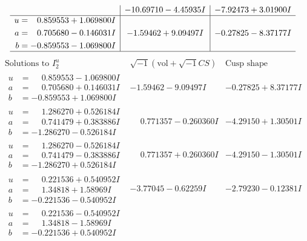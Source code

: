 \documentclass[1p]{elsarticle_modified}
\theoremstyle{definition}
\newcommand{\I}{\sqrt{-1}}
\begin{document}
$$\begin{array}{c|c|c}
 & -10.69710 - 4.45935 I & -7.92473 + 3.01900 I \\ \hline\begin{aligned}
u &= \phantom{-}0.859553 + 1.069800 I \\
a &= \phantom{-}0.705680 - 0.146031 I \\
b &= -0.859553 - 1.069800 I\end{aligned}
 & -1.59462 + 9.09497 I & -0.27825 - 8.37177 I\\
 \hline 
 \end{array}$$\newpage$$\begin{array}{c|c|c}  
\text{Solutions to }I^u_{2}& \I (\text{vol} + \sqrt{-1}CS) & \text{Cusp shape}\\
 \hline 
\begin{aligned}
u &= \phantom{-}0.859553 - 1.069800 I \\
a &= \phantom{-}0.705680 + 0.146031 I \\
b &= -0.859553 + 1.069800 I\end{aligned}
 & -1.59462 - 9.09497 I & -0.27825 + 8.37177 I \\ \hline\begin{aligned}
u &= \phantom{-}1.286270 + 0.526184 I \\
a &= \phantom{-}0.741479 + 0.383886 I \\
b &= -1.286270 - 0.526184 I\end{aligned}
 & \phantom{-}0.771357 - 0.260360 I & -4.29150 + 1.30501 I \\ \hline\begin{aligned}
u &= \phantom{-}1.286270 - 0.526184 I \\
a &= \phantom{-}0.741479 - 0.383886 I \\
b &= -1.286270 + 0.526184 I\end{aligned}
 & \phantom{-}0.771357 + 0.260360 I & -4.29150 - 1.30501 I \\ \hline\begin{aligned}
u &= \phantom{-}0.221536 + 0.540952 I \\
a &= \phantom{-}1.34818 + 1.58969 I \\
b &= -0.221536 - 0.540952 I\end{aligned}
 & -3.77045 - 0.62259 I & -2.79230 - 0.12381 I \\ \hline\begin{aligned}
u &= \phantom{-}0.221536 - 0.540952 I \\
a &= \phantom{-}1.34818 - 1.58969 I \\
b &= -0.221536 + 0.540952 I\end{aligned}

\end{array}$$
\end{document}
